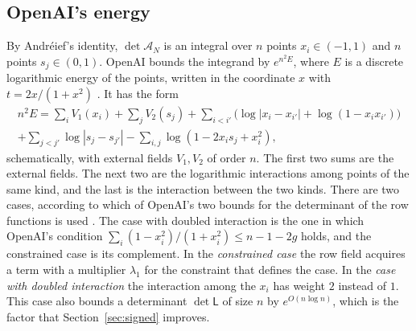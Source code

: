 \documentclass[11pt]{amsart}
\theoremstyle{definition}
\theoremstyle{remark}
\numberwithin{equation}{section}
\newcommand{\cA}{\mathcal A}
\begin{document}
\subsection{OpenAI's energy}\label{ssec:energy}
By Andr\'eief's identity, $\det\cA_N$ is an integral over $n$ points $x_i\in(-1,1)$ and $n$ points
$s_j\in(0,1)$. OpenAI bounds the integrand by $e^{n^2E}$, where $E$ is a discrete logarithmic energy of the
points, written in the coordinate $x$ with $t=2x/(1+x^2)$ \cite[\S5]{OpenAI2026}. It has the form
\begin{multline*}
 n^2E=\sum_iV_1(x_i)+\sum_jV_2(s_j)+\sum_{i<i'}\bigl(\log|x_i-x_{i'}|+\log(1-x_ix_{i'})\bigr)\\
 +\sum_{j<j'}\log|s_j-s_{j'}|-\sum_{i,j}\log(1-2x_is_j+x_i^2),
\end{multline*}
schematically, with external fields $V_1,V_2$ of order $n$. The first two sums are the
external fields. The next two are the logarithmic interactions among points of the same kind, and the last
is the interaction between the two kinds. There are two cases, according to which of OpenAI's two bounds for
the determinant of the row functions is used \cite[Props.~5.2, 5.3]{OpenAI2026}. The case with doubled interaction is the one in which OpenAI's condition
$\sum_i(1-x_i^2)/(1+x_i^2)\le n-1-2g$ \cite[Eq.~(67)]{OpenAI2026} holds, and the constrained case is its complement. In the \emph{constrained
case} the row field acquires a term with a multiplier $\lambda_1$ for the constraint that defines the case.
In the \emph{case with doubled interaction} the interaction among the $x_i$ has weight $2$ instead of $1$. This case also bounds a determinant
$\det\mathsf L$ of size $n$ by $e^{O(n\log n)}$, which is the factor that Section~\ref{sec:signed} improves.
\end{document}
